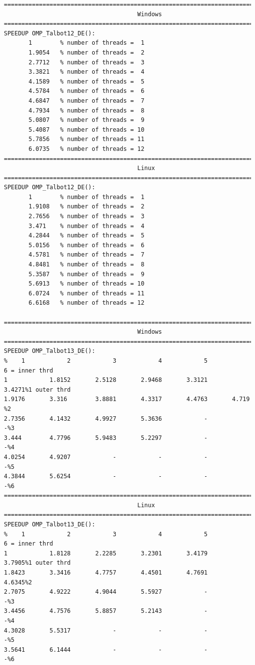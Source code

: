 \documentclass[a4paper,10pt]{report}%
\begin{document}
\begin{lstlisting}
====================================================================================
                                      Windows
====================================================================================
SPEEDUP OMP_Talbot12_DE():
       1        % number of threads =  1
       1.9054   % number of threads =  2
       2.7712   % number of threads =  3
       3.3821   % number of threads =  4
       4.1589   % number of threads =  5
       4.5784   % number of threads =  6
       4.6847   % number of threads =  7
       4.7934   % number of threads =  8
       5.0807   % number of threads =  9
       5.4087   % number of threads = 10
       5.7856   % number of threads = 11
       6.0735   % number of threads = 12
====================================================================================
                                      Linux
====================================================================================
SPEEDUP OMP_Talbot12_DE():
       1        % number of threads =  1
       1.9108   % number of threads =  2
       2.7656   % number of threads =  3
       3.471    % number of threads =  4
       4.2844   % number of threads =  5
       5.0156   % number of threads =  6
       4.5781   % number of threads =  7
       4.8481   % number of threads =  8
       5.3587   % number of threads =  9
       5.6913   % number of threads = 10
       6.0724   % number of threads = 11
       6.6168   % number of threads = 12

====================================================================================
                                      Windows
====================================================================================
SPEEDUP OMP_Talbot13_DE():
%    1            2            3            4            5            6 = inner thrd
1            1.8152       2.5128       2.9468       3.3121       3.4271%1 outer thrd
1.9176       3.316        3.8881       4.3317       4.4763       4.719 %2
2.7356       4.1432       4.9927       5.3636            -            -%3
3.444        4.7796       5.9483       5.2297            -            -%4
4.0254       4.9207            -            -            -            -%5
4.3844       5.6254            -            -            -            -%6
====================================================================================
                                      Linux
====================================================================================
SPEEDUP OMP_Talbot13_DE():
%    1            2            3            4            5            6 = inner thrd
1            1.8128       2.2285       3.2301       3.4179       3.7905%1 outer thrd
1.8423       3.3416       4.7757       4.4501       4.7691       4.6345%2
2.7075       4.9222       4.9044       5.5927            -            -%3
3.4456       4.7576       5.8857       5.2143            -            -%4
4.3028       5.5317            -            -            -            -%5
3.5641       6.1444            -            -            -            -%6
\end{lstlisting}
\end{document}
